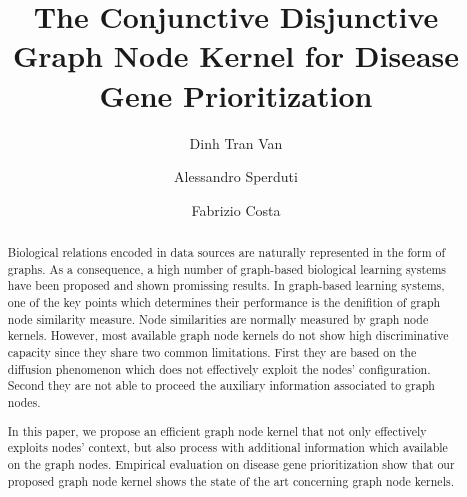 \documentclass[review]{elsarticle}
\begin{document}
\begin{frontmatter}

\title{The Conjunctive Disjunctive Graph Node Kernel for Disease Gene Prioritization}

\author{Dinh Tran Van}
\author{Alessandro Sperduti}
\address{Department of Mathematics, Padova University, Trieste, 63, 35121 Padova, Italy}
\author{Fabrizio Costa}
\address{Department of Computer Science, University of Exeter Exeter EX4 4QF, UK}




\begin{abstract}
Biological relations encoded in data sources are naturally represented in the form of graphs. As a consequence, a high number of graph-based biological learning systems have been proposed and shown promissing results. In graph-based learning systems, one of the key points which determines their performance is the denifition of graph node similarity measure. Node similarities are normally measured by graph node kernels. However, most available graph node kernels do not show high discriminative capacity since they share two common limitations. First they are based on the diffusion phenomenon which does not effectively exploit the nodes' configuration. Second they are not able to proceed the auxiliary information associated to graph nodes.

In this paper, we propose an efficient graph node kernel that not only effectively exploits nodes' context, but also process with additional information which available on the graph nodes. Empirical evaluation on disease gene prioritization show that our proposed graph node kernel shows the state of the art concerning graph node kernels.

\end{abstract}


\end{frontmatter}
\end{document}
